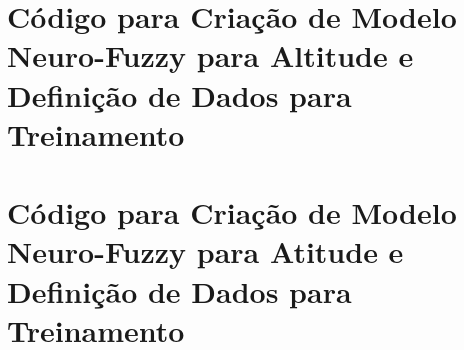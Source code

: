 %
%

\begin{apendicesenv}
\partapendices

\chapter{Código para Criação de Modelo Neuro-Fuzzy para Altitude e Definição de Dados para Treinamento}
\label{chap:train-anfis-altitude}

%


\chapter{Código para Criação de Modelo Neuro-Fuzzy para Atitude e Definição de Dados para Treinamento}
\label{chap:train-anfis-atitude}



\end{apendicesenv}
